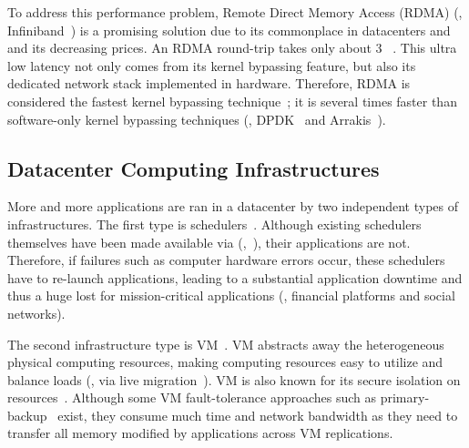 To address this \paxos performance problem, Remote Direct Memory Access (RDMA) 
(\eg, Infiniband~\cite{infiniband}) is a promising solution due to its 
commonplace in datacenters and and its decreasing prices. An RDMA round-trip 
takes only about 3 \us~\cite{pilaf:usenix14}. This ultra low latency not only 
comes from its kernel bypassing feature, but also its dedicated network stack 
implemented in hardware. Therefore, RDMA is considered the fastest kernel 
bypassing technique~\cite{herd:sigcomm14,pilaf:usenix14,dare:hpdc15}; it is 
several times faster than software-only kernel bypassing techniques (\eg, 
DPDK~\cite{dpdk} and Arrakis~\cite{arrakis:osdi14}).

\vspace{-.15in}\subsection{Datacenter Computing Infrastructures}
\label{sec:datacenter}\vspace{-.075in}

More and more applications are ran in a datacenter by two 
independent types of infrastructures. The first type is 
schedulers~\cite{borg:eurosys15,mesos:nsdi11,tupperware, yarn:socc13, 
autopilot:sosp07,quincy:sosp09,apollo:osdi14,fuxi:vldb14}. Although existing 
schedulers themselves have been made available via \paxos 
(\eg,~\cite{mesos:nsdi11}), their applications are not. Therefore, if failures 
such as computer hardware errors occur, these schedulers have to re-launch 
applications, leading to a substantial application downtime and thus a 
huge lost for mission-critical applications (\eg, financial platforms and social 
networks).

The second infrastructure type is VM~\cite{amazon:vpc, openstack, esx:osdi02, 
kvm, xen:sosp}. VM abstracts away the heterogeneous physical computing 
resources, making computing resources easy to utilize and balance loads (\eg, 
via live migration~\cite{vmotion:atc05,xen:migration:nsdi05}). VM is also known 
for its secure isolation on resources~\cite{xen:sosp,kvm,vmware:sugerman}. 
Although some VM fault-tolerance approaches such 
as primary-backup~\cite{remus:nsdi08} exist, they consume much 
time and network bandwidth as they need to transfer all memory modified by 
applications across VM replications.

